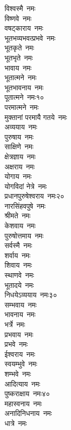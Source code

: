 \begin{multicols}{2}
\begin{flushleft}
विश्वस्मै~नमः\\
विष्णवे~नमः\\
वषट्काराय~नमः\\
भूतभव्यभवत्प्रभवे~नमः\\
भूतकृते~नमः\\
भूतभृते~नमः\\
भावाय~नमः\\
भूतात्मने~नमः\\
भूतभावनाय~नमः\\
पूतात्मने~नमः\hfill १०\\
परमात्मने~नमः\\
मुक्तानां परमायै गतये~नमः\\
अव्ययाय~नमः\\
पुरुषाय~नमः\\
साक्षिणे~नमः\\
क्षेत्रज्ञाय~नमः\\
अक्षराय~नमः\\
योगाय~नमः\\
योगविदां नेत्रे~नमः\\
प्रधानपुरुषेश्वराय~नमः\hfill २०\\
नारसिंहवपुषे~नमः\\
श्रीमते~नमः\\
केशवाय~नमः\\
पुरुषोत्तमाय~नमः\\
सर्वस्मै~नमः\\
शर्वाय~नमः\\
शिवाय~नमः\\
स्थाणवे~नमः\\
भूतादये~नमः\\
निधयेऽव्ययाय~नमः\hfill ३०\\
सम्भवाय~नमः\\
भावनाय~नमः\\
भर्त्रे~नमः\\
प्रभवाय~नमः\\
प्रभवे~नमः\\
ईश्वराय~नमः\\
स्वयम्भुवे~नमः\\
शम्भवे~नमः\\
आदित्याय~नमः\\
पुष्कराक्षाय~नमः\hfill ४०\\
महास्वनाय~नमः\\
अनादिनिधनाय~नमः\\
धात्रे~नमः\\

\end{flushleft}
\end{multicols}
